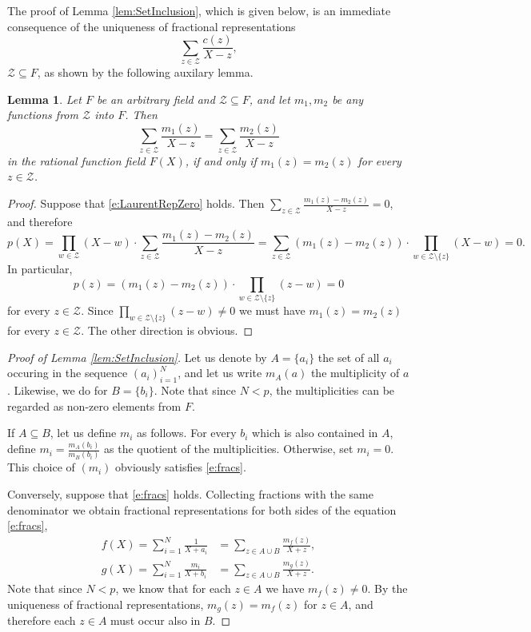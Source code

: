\documentclass[11pt]{article}
\newtheorem{lem}[]{Lemma}
\theoremstyle{definition}
\theoremstyle{remark}
\begin{document}
The proof of Lemma \ref{lem:SetInclusion}, which is given below, is an immediate consequence of the uniqueness of fractional representations
\[
\sum_{z \in \mathcal Z} \frac{c(z)}{X - z},
\]
$\mathcal Z\subseteq F$, as shown by the following auxilary lemma.
\begin{lem}
\label{lem:UniqueFractionalRep}
Let $F$ be an arbitrary field and $\mathcal Z\subseteq F$, and let $m_1, m_2$ be any functions from $\mathcal Z$ into $F$.
Then
\begin{equation}
\label{e:LaurentRepZero}
\sum_{z\in\mathcal Z} \frac{m_1(z)}{X - z} = \sum_{z\in\mathcal Z} \frac{m_2(z)}{X - z}
\end{equation}
in the rational function field $F(X)$, if and only if $m_1(z)=m_2(z)$ for every $z\in \mathcal Z$.
\end{lem}
\begin{proof}
Suppose that \eqref{e:LaurentRepZero} holds.  
Then $\sum_{z\in\mathcal Z} \frac{m_1(z)-m_2(z)}{X - z} = 0$, and therefore
\[
p(X) = \prod_{w\in\mathcal Z} (X - w)\cdot\sum_{z\in\mathcal Z} \frac{m_1(z)-m_2(z)}{X - z} = \sum_{z\in\mathcal Z} (m_1(z)-m_2(z))\cdot \prod_{w\in\mathcal Z\setminus\{z\}} (X - w) = 0.
\]
In particular,
\[
p(z) = (m_1(z) - m_2(z)) \cdot  \prod_{w\in\mathcal Z\setminus\{z\}} (z - w)= 0
\]
for every $z\in\mathcal Z$.
Since   $\prod_{w\in\mathcal Z\setminus\{z\}} (z - w) \neq 0$ we must have $m_1(z)  = m_2(z)$ for every $z\in\mathcal Z$. 
The other direction is obvious.
\end{proof}


\begin{proof}[Proof of Lemma \ref{lem:SetInclusion}]
Let us denote by $A=\{a_i\}$ the set of all $a_i$ occuring in the sequence $(a_i)_{i=1}^N$, and let us write 
$m_A(a)$ the multiplicity of $a$.
Likewise, we do for $B=\{b_i\}$.
Note that since $N < p$, the multiplicities can be regarded as non-zero elements from $F$.

If $A\subseteq B$, let us define $m_i$ as follows.
For every $b_i$ which is also contained in $A$, define $m_i =\frac{m_A(b_i)}{m_B(b_i)}$ as the quotient of the multiplicities.
Otherwise, set $m_i = 0$.
This choice of $(m_i)$ obviously satisfies \eqref{e:fracs}.

Conversely, suppose that \eqref{e:fracs} holds.
Collecting fractions with the same denominator we obtain fractional representations for both sides of the equation \eqref{e:fracs},  
\begin{align*}
f(X) = \sum_{i=1}^N \frac{1}{X + a_i} &= \sum_{z\in A\cup B} \frac{m_f(z)}{X + z},
\\
g(X) = \sum_{i=1}^N \frac{m_i}{X + b_i} & = \sum_{z\in A\cup B} \frac{m_g(z)}{X + z}.
\end{align*}
Note that since $N < p$, we know that for each $z\in A$ we have $m_f(z)\neq 0$. 
By the uniqueness of fractional representations,  $m_g(z) = m_f(z)$ for $z\in A$, and therefore each $z\in A$ must occur also in $B$. 
\end{proof}
\end{document}
